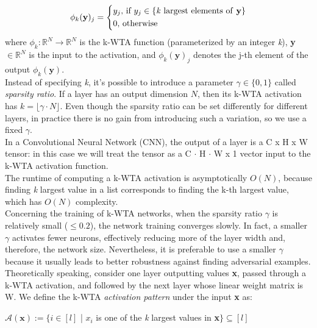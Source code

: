 \documentclass[a4paper]{article}
\begin{document}
	\begin{equation}
	\phi_{k}(\textbf{y})_{j} = 
	\begin{cases*}
	y_{j}\textrm{, if }y_{j} \in\{\textrm{\textit{k} largest elements of \textbf{y}}\} \\
	0 \textrm{, otherwise}
	\end{cases*}
	\end{equation}
	where $\phi_{k}: \mathbb{R}^{N} \rightarrow \mathbb{R}^{N}$ is the k-WTA function (parameterized by an integer \textit{k}), \textbf{y} $\in \mathbb{R}^{N}$ is the input to the activation, and $\phi_{k}(\textbf{y})_{j}$ denotes the j-th element of the output $\phi_{k}(\textbf{y})$.\\
	Instead of specifying \textit{k}, it's possible to introduce a parameter $\gamma \in \{0,1\}$ called \emph{sparsity ratio}. If a layer has an output dimension $N$, then its k-WTA activation has  $k = \lfloor\gamma \cdot N\rfloor$. Even though the sparsity ratio can be set differently for different layers, in practice there is no gain from introducing such a variation, so we use a fixed $\gamma$.\\
	In a Convolutional Neural Network (CNN), the output of a layer is a C x H x W tensor: in this case we will treat the tensor as a C $\cdot$ H $\cdot$ W x 1 vector input to the k-WTA activation function.\\
	The runtime of computing a k-WTA activation is asymptotically $O(N)$, because finding \textit{k} largest value in a list corresponds to finding the k-th largest value, which has $O(N)$ complexity.\\
	Concerning the training of k-WTA networks, when the sparsity ratio $\gamma$ is relatively small ($\le 0.2$), the network training converges slowly. In fact, a smaller $\gamma$ activates fewer neurons, effectively reducing more of the layer width and, therefore, the network size. Nevertheless, it is preferable to use a smaller $\gamma$ because it usually leads to better robustness against finding adversarial examples.\\
	Theoretically speaking, consider one layer outputting values \textbf{x}, passed through  a k-WTA activation, and followed by the next layer whose linear weight matrix is
	W. We define the k-WTA \emph{activation pattern} under the input \textbf{x} as:
	\begin{center}
		$\mathcal{A}(\textbf{x}) := \{i \in [l]$ | $x_{i}$ is one of the \textit{k} largest values in \textbf{x}$\} \subseteq [l]$
	\end{center}
\end{document}
